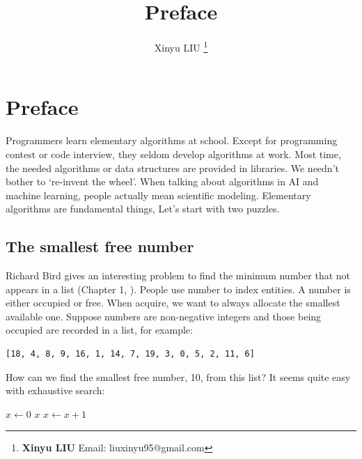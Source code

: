 \documentclass[b5paper]{article}
\begin{document}
\title{Preface}

\author{Xinyu LIU
\thanks{{\bfseries Xinyu LIU} \newline
  Email: liuxinyu95@gmail.com \newline}
  }

\maketitle
\fi


\chapter*{Preface}

Programmers learn elementary algorithms at school. Except for programming contest or code interview, they seldom develop algorithms at work. Most time, the needed algorithms or data structures are provided in libraries. We needn't bother to `re-invent the wheel'. When talking about algorithms in AI and machine learning, people actually mean scientific modeling. Elementary algorithms are fundamental things, Let's start with two puzzles.

\section*{The smallest free number}
\label{min-free} 

Richard Bird gives an interesting problem to find the minimum number that not appears in a list (Chapter 1, \cite{Bird-book}). People use number to index entities. A number is either occupied or free. When acquire, we want to always allocate the smallest available one. Suppose numbers are non-negative integers and those being occupied are recorded in a list, for example:

\begin{Verbatim}[fontsize=\footnotesize]
[18, 4, 8, 9, 16, 1, 14, 7, 19, 3, 0, 5, 2, 11, 6]
\end{Verbatim}

How can we find the smallest free number, 10, from this list? It seems quite easy with exhaustive search:

\begin{algorithmic}[1]
  \State $x \gets 0$
  \Loop
      \State \Return $x$
    \Else
      \State $x \gets x + 1$
    \EndIf
  \EndLoop
\EndFunction
\end{algorithmic}
\end{document}
